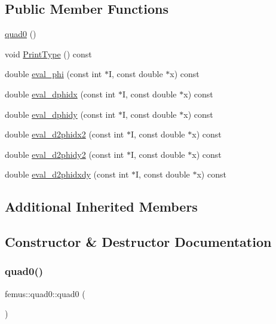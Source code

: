 \subsection*{Public Member Functions}
\begin{DoxyCompactItemize}
\item 
\mbox{\hyperlink{classfemus_1_1quad0_a28d7ce7531c935581e561420a3055be9}{quad0}} ()
\item 
void \mbox{\hyperlink{classfemus_1_1quad0_a8dd7e0be853baa57c6ad824aeb086b79}{Print\+Type}} () const
\item 
double \mbox{\hyperlink{classfemus_1_1quad0_a65b24fd1a96cf9df09f570ca222b84e5}{eval\+\_\+phi}} (const int $\ast$I, const double $\ast$x) const
\item 
double \mbox{\hyperlink{classfemus_1_1quad0_a133c55e14eebed1f15970ce98f3823b6}{eval\+\_\+dphidx}} (const int $\ast$I, const double $\ast$x) const
\item 
double \mbox{\hyperlink{classfemus_1_1quad0_a94e861fcc24e2013fac6bdc1a07a88d8}{eval\+\_\+dphidy}} (const int $\ast$I, const double $\ast$x) const
\item 
double \mbox{\hyperlink{classfemus_1_1quad0_ab862ac9e1b07aa072f566a753b1948a8}{eval\+\_\+d2phidx2}} (const int $\ast$I, const double $\ast$x) const
\item 
double \mbox{\hyperlink{classfemus_1_1quad0_a8dc516b64dc264896404b1d40019103a}{eval\+\_\+d2phidy2}} (const int $\ast$I, const double $\ast$x) const
\item 
double \mbox{\hyperlink{classfemus_1_1quad0_aa1987456dd6bdacb2b9038c21bc17566}{eval\+\_\+d2phidxdy}} (const int $\ast$I, const double $\ast$x) const
\end{DoxyCompactItemize}
\subsection*{Additional Inherited Members}


\subsection{Constructor \& Destructor Documentation}
\mbox{\label{classfemus_1_1quad0_a28d7ce7531c935581e561420a3055be9}} 
\subsubsection{\texorpdfstring{quad0()}{quad0()}}
{\footnotesize\ttfamily femus\+::quad0\+::quad0 (\begin{DoxyParamCaption}{ }\end{DoxyParamCaption})\hspace{0.3cm}{\ttfamily [inline]}}



